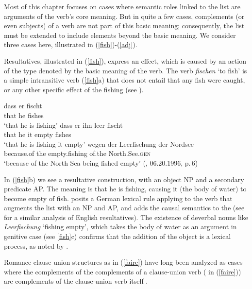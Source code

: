 \documentclass[output=paper
                ,modfonts
                ,nonflat
	        ,collection
	        ,collectionchapter
	        ,collectiontoclongg
 	        ,biblatex
                ,babelshorthands
                ,newtxmath
                ,draftmode
                ,colorlinks, citecolor=brown
]{./langsci/langscibook}
\begin{document}
Most of this chapter focuses on cases where semantic roles linked to the \argst list are arguments of the verb's core meaning. But in quite a few cases, complements (or even subjects) of a verb are not part of this basic meaning; consequently, the \argst list must be extended to include elements beyond the basic meaning. We consider three cases here, illustrated in (\ref{fish})-(\ref{adj}).  

Resultatives,  illustrated in (\ref{fish}), express an effect, which is caused by an action of the type denoted by the basic meaning of the verb. The verb \textit{fischen} `to fish' is a simple intransitive verb (\ref{fish}a) that does not entail that any fish were caught, or any other specific effect of the fishing (see \citealt[219--220]{Mueller2002b}).  

\begin{exe}
\ex\label{fish}
\begin{xlist}
\ex
\gll dass er  fischt\\
     that he  fishes\\
\glt `that he is fishing'
\ex 
\gll dass er ihn leer fischt\\
     that he it empty fishes\\
\glt `that he is fishing it empty'
\ex 
\gll wegen der Leerfischung der Nordsee \\
     because.of the empty.fishing of.the North.See.\textsc{gen} \\
\glt `because of the North Sea being fished empty' (, 06.20.1996, p.\,6)
\end{xlist}
\end{exe}

\noindent
 In (\ref{fish}b) we see a resultative construction, with an object NP and a secondary predicate AP.  The meaning is that he is fishing, causing it (the body of water) to become empty of fish.  \citet[241]{Mueller2002b} posits a German lexical rule applying to the verb that augments the \argst list with an NP and AP, and adds the causal semantics to the \content (see \citealt{Wechsler2005result} for a similar analysis of English resultatives).     The existence of deverbal nouns like \textit{Leerfischung} `fishing empty', which takes the body of water as an argument in genitive case (see \ref{fish}c) confirms that the addition of the object is a lexical process, as noted by \citet{Mueller2002b}.  

Romance clause-union structures as in (\ref{faire}) have long been analyzed as cases where the complements of the complements of a clause-union verb ( in (\ref{faire})) are complements of the clause-union verb itself \citep{Aissen1979}.
\end{document}

